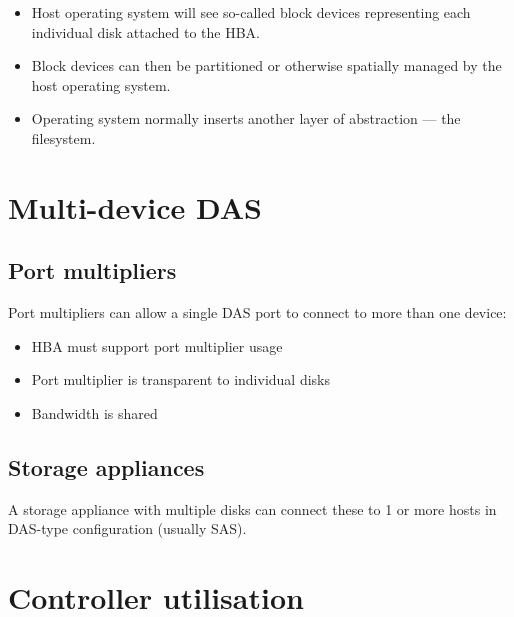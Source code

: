 \documentclass[slides]{pgnotes}
\begin{document}
\begin{itemize}
\item
  Host operating system will see so-called block devices representing
  each individual disk attached to the HBA.
\item
  Block devices can then be partitioned or otherwise spatially managed
  by the host operating system.
\item
  Operating system normally inserts another layer of abstraction --- the
  filesystem.
\end{itemize}

\section{Multi-device DAS}\label{multi-device-das}

\subsection{Port multipliers}\label{port-multipliers}

Port multipliers can allow a single DAS port to connect to more than one
device:

\begin{minipage}{0.6\linewidth}
\begin{itemize}
\item
  HBA must support port multiplier usage
\item
  Port multiplier is transparent to individual disks
\item
  Bandwidth is shared
\end{itemize}
\end{minipage}
\begin{minipage}{0.4\linewidth}
\end{minipage}

\subsection{Storage appliances}
\label{sec:storage-appliances}

A storage appliance with multiple disks can connect these to 1 or more
hosts in DAS-type configuration (usually SAS).

\section{Controller utilisation}
\label{sec:controller-utilisation}
\end{document}
